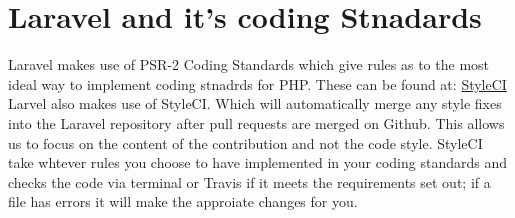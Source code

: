 \documentclass[12pt,a4paper]{article}
\begin{document}
	\section{Laravel and it's coding Stnadards}
	Laravel makes use of PSR-2 Coding Standards which give rules as to the most ideal way to implement coding stnadrds for PHP. \newline These can be found at:  \href{https://github.com/php-fig/fig-standards/blob/master/accepted/PSR-2-coding-style-guide.md}{StyleCI}
\newline Larvel also makes use of StyleCI. Which will automatically merge any style fixes into the Laravel repository after pull requests are merged on Github. This allows us to focus on the content of the contribution and not the code style.
\newline StyleCI take whtever rules you choose to have implemented in  your coding standards and checks the code via terminal or Travis if it meets the requirements set out; if a file has errors it will make the approiate changes for you.	
\end{document}
